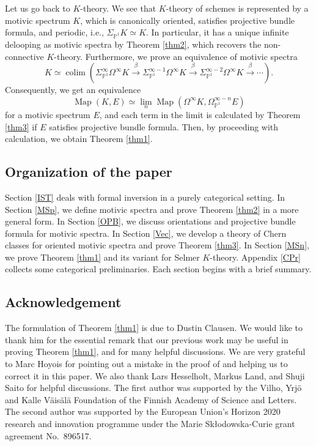 \documentclass{amsart}
\theoremstyle{plain}
\theoremstyle{definition}
\theoremstyle{remark}
\numberwithin{equation}{theorem}
\newcommand{\OmegaP}{\Omega_{\mathbb{P}^1}}
\newcommand{\SigmaP}{\Sigma_{\mathbb{P}^1}}
\newcommand{\Map}{\operatorname{Map}}
\newcommand{\colim}{\operatorname*{colim}}
\begin{document}
Let us go back to $K$-theory.
We see that $K$-theory of schemes is represented by a motivic spectrum $K$, which is canonically oriented, satisfies projective bundle formula, and periodic, i.e., $\SigmaP K\simeq K$.
In particular, it has a unique infinite delooping as motivic spectra by Theorem \ref{thm2}, which recovers the non-connective $K$-theory.
Furthermore, we prove an equivalence of motivic spectra 
\[
	K \simeq \colim(\SigmaP^\infty\Omega^\infty K \xrightarrow{\beta}
		\SigmaP^{\infty-1}\Omega^\infty K \xrightarrow{\beta} \SigmaP^{\infty-2}\Omega^\infty K \xrightarrow{\beta} \cdots).
\]
Consequently, we get an equivalence
\[
	\Map(K,E) \simeq \lim_n\Map(\Omega^\infty K,\OmegaP^{\infty-n} E)
\]
for a motivic spectrum $E$, and each term in the limit is calculated by Theorem \ref{thm3} if $E$ satisfies projective bundle formula.
Then, by proceeding with calculation, we obtain Theorem \ref{thm1}.


\subsection{Organization of the paper}

Section \ref{IST} deals with formal inversion in a purely categorical setting.
In Section \ref{MSp}, we define motivic spectra and prove Theorem \ref{thm2} in a more general form.
In Section \ref{OPB}, we discuss orientations and projective bundle formula for motivic spectra.
In Section \ref{Vec}, we develop a theory of Chern classes for oriented motivic spectra and prove Theorem \ref{thm3}.
In Section \ref{MSn}, we prove Theorem \ref{thm1} and its variant for Selmer $K$-theory.
Appendix \ref{CPr} collects some categorical preliminaries.
Each section begins with a brief summary.


\subsection{Acknowledgement}

The formulation of Theorem \ref{thm1} is due to Dustin Clausen.
We would like to thank him for the essential remark that our previous work \cite{AI} may be useful in proving Theorem \ref{thm1}, and for many helpful discussions.
We are very grateful to Marc Hoyois for pointing out a mistake in the proof of \cite{AI} and helping us to correct it in this paper.
We also thank Lars Hesselholt, Markus Land, and Shuji Saito for helpful discussions.
The first author was supported by the Vilho, Yrj\"o and Kalle V\"ais\"al\"a Foundation of the Finnish Academy of Science and Letters.
The second author was supported by the European Union's Horizon 2020 research and innovation programme under the Marie Sk\l{}odowska-Curie grant agreement No.\ 896517.
\end{document}
